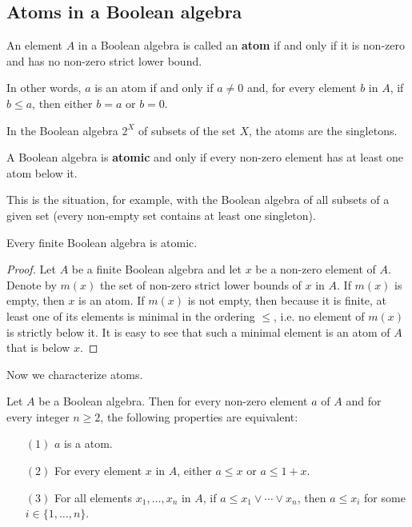 \subsection{Atoms in a Boolean algebra}
\begin{definition}
An element $A$ in a Boolean algebra is called an \textbf{atom} if and only if it is non-zero and has no non-zero strict lower bound.
\end{definition}
In other words, $a$ is an atom if and only if $a\neq0$ and, for every element $b$ in $A$, 
if $b\leq a$, then either $b=a$ or $b=0$.
\begin{example}
In the Boolean algebra $2^X$ of subsets of the set $X$, the atoms are the singletons.
\end{example}
\begin{definition}
A Boolean algebra is \textbf{atomic} and only if every non-zero element has at least one atom below it.
\end{definition}
This is the situation, for example, with the Boolean algebra of all subsets of a
given set (every non-empty set contains at least one singleton).
\begin{theorem}\label{Bool ring finite atomic}
Every finite Boolean algebra is atomic.
\end{theorem}
\begin{proof}
Let $A$ be a finite Boolean algebra and let $x$ be a non-zero element of $A$. Denote by $m(x)$ the set of 
non-zero strict lower bounds of $x$ in $A$. If $m(x)$ is empty, then $x$ is an atom. If $m(x)$ is not empty, 
then because it is finite, at least one of its elements is minimal in the ordering $\leq$, i.e. no element of $m(x)$ is strictly below it. 
It is easy to see that such a minimal element is an atom of $A$ that is below $x$.
\end{proof}
Now we characterize atoms.
\begin{theorem}\label{Bool ring atom iff}
Let $A$ be a Boolean algebra. Then for every non-zero element $a$ of $A$ and for every integer $n\geq2$, the following properties are equivalent:
\begin{itemize}
\item[$(1)$] $a$ is a atom.
\item[$(2)$] For every element $x$ in $A$, either $a\leq x$ or $a\leq 1+x$.
\item[$(3)$] For all elements $x_1,\dots,x_n$ in $A$, if $a\leq x_1\vee\cdots\vee x_n$, then $a\leq x_i$ for some $i\in\{1,\dots,n\}$.
\end{itemize}
\end{theorem}
